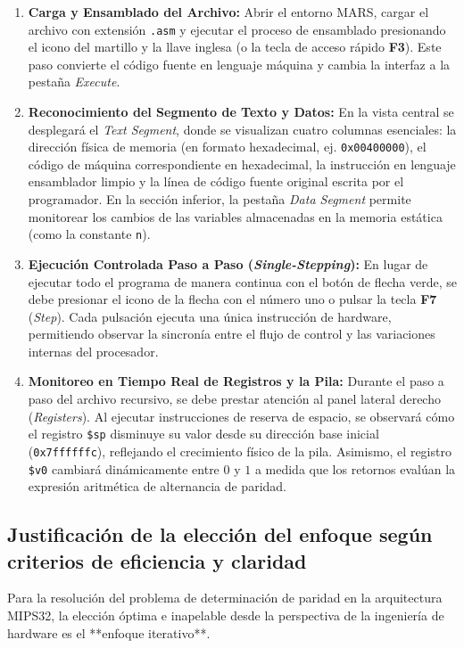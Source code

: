 \documentclass[12pt,letterpaper]{article}
\begin{document}
\begin{enumerate}
    \item \textbf{Carga y Ensamblado del Archivo:}
    Abrir el entorno MARS, cargar el archivo con extensión \texttt{.asm} y ejecutar el proceso de ensamblado presionando el icono del martillo y la llave inglesa (o la tecla de acceso rápido \textbf{F3}). Este paso convierte el código fuente en lenguaje máquina y cambia la interfaz a la pestaña \textit{Execute}.
    
    \item \textbf{Reconocimiento del Segmento de Texto y Datos:}
    En la vista central se desplegará el \textit{Text Segment}, donde se visualizan cuatro columnas esenciales: la dirección física de memoria (en formato hexadecimal, ej. \texttt{0x00400000}), el código de máquina correspondiente en hexadecimal, la instrucción en lenguaje ensamblador limpio y la línea de código fuente original escrita por el programador. En la sección inferior, la pestaña \textit{Data Segment} permite monitorear los cambios de las variables almacenadas en la memoria estática (como la constante \texttt{n}).
    
    \item \textbf{Ejecución Controlada Paso a Paso (\textit{Single-Stepping}):}
    En lugar de ejecutar todo el programa de manera continua con el botón de flecha verde, se debe presionar el icono de la flecha con el número uno o pulsar la tecla \textbf{F7} (\textit{Step}). Cada pulsación ejecuta una única instrucción de hardware, permitiendo observar la sincronía entre el flujo de control y las variaciones internas del procesador.
    
    \item \textbf{Monitoreo en Tiempo Real de Registros y la Pila:}
    Durante el paso a paso del archivo recursivo, se debe prestar atención al panel lateral derecho (\textit{Registers}). Al ejecutar instrucciones de reserva de espacio, se observará cómo el registro \texttt{\$sp} disminuye su valor desde su dirección base inicial (\texttt{0x7ffffffc}), reflejando el crecimiento físico de la pila. Asimismo, el registro \texttt{\$v0} cambiará dinámicamente entre $0$ y $1$ a medida que los retornos evalúan la expresión aritmética de alternancia de paridad.
\end{enumerate}

\subsection{Justificación de la elección del enfoque según criterios de eficiencia y claridad}
Para la resolución del problema de determinación de paridad en la arquitectura MIPS32, la elección óptima e inapelable desde la perspectiva de la ingeniería de hardware es el **enfoque iterativo**.
\end{document}
